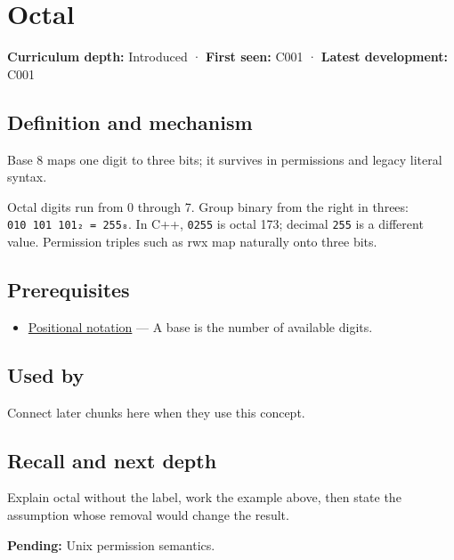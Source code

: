 \hypertarget{appendix-17fc1bc8b305}{}
\section{Octal}\label{appendix-17fc1bc8b305-octal}

\textbf{Curriculum depth:} Introduced · \textbf{First seen:} C001 · \textbf{Latest development:} C001

\subsection{Definition and mechanism}\label{appendix-17fc1bc8b305-definition-and-mechanism}

Base 8 maps one digit to three bits; it survives in permissions and legacy literal syntax.

Octal digits run from 0 through 7. Group binary from the right in threes: \texttt{010\ 101\ 101₂\ =\ 255₈}. In C++, \texttt{0255} is octal 173; decimal \texttt{255} is a different value. Permission triples such as rwx map naturally onto three bits.

\subsection{Prerequisites}\label{appendix-17fc1bc8b305-prerequisites}

\begin{itemize}
\tightlist
\item
  \hyperref[appendix-83c3f28f7bda]{Positional notation} --- A base is the number of available digits.
\end{itemize}

\subsection{Used by}\label{appendix-17fc1bc8b305-used-by}

Connect later chunks here when they use this concept.

\subsection{Recall and next depth}\label{appendix-17fc1bc8b305-recall-and-next-depth}

Explain octal without the label, work the example above, then state the assumption whose removal would change the result.

\textbf{Pending:} Unix permission semantics.

